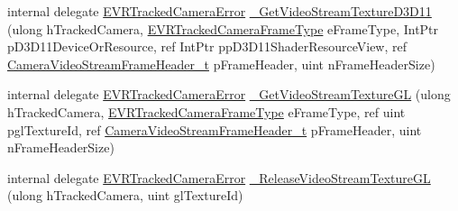 \begin{DoxyCompactItemize}
\item 
internal delegate \mbox{\hyperlink{namespace_valve_1_1_v_r_ad0e012e846f5d93848783c044614cfd3}{E\+V\+R\+Tracked\+Camera\+Error}} \mbox{\hyperlink{struct_valve_1_1_v_r_1_1_i_v_r_tracked_camera_a3b47cba3117a77b9f31e6e58ceb9936e}{\+\_\+\+Get\+Video\+Stream\+Texture\+D3\+D11}} (ulong h\+Tracked\+Camera, \mbox{\hyperlink{namespace_valve_1_1_v_r_a9962211bc3fe98c2683db188c12c9afd}{E\+V\+R\+Tracked\+Camera\+Frame\+Type}} e\+Frame\+Type, Int\+Ptr p\+D3\+D11\+Device\+Or\+Resource, ref Int\+Ptr pp\+D3\+D11\+Shader\+Resource\+View, ref \mbox{\hyperlink{struct_valve_1_1_v_r_1_1_camera_video_stream_frame_header__t}{Camera\+Video\+Stream\+Frame\+Header\+\_\+t}} p\+Frame\+Header, uint n\+Frame\+Header\+Size)
\item 
internal delegate \mbox{\hyperlink{namespace_valve_1_1_v_r_ad0e012e846f5d93848783c044614cfd3}{E\+V\+R\+Tracked\+Camera\+Error}} \mbox{\hyperlink{struct_valve_1_1_v_r_1_1_i_v_r_tracked_camera_afb798bb54c37360e64429e07763b6cff}{\+\_\+\+Get\+Video\+Stream\+Texture\+GL}} (ulong h\+Tracked\+Camera, \mbox{\hyperlink{namespace_valve_1_1_v_r_a9962211bc3fe98c2683db188c12c9afd}{E\+V\+R\+Tracked\+Camera\+Frame\+Type}} e\+Frame\+Type, ref uint pgl\+Texture\+Id, ref \mbox{\hyperlink{struct_valve_1_1_v_r_1_1_camera_video_stream_frame_header__t}{Camera\+Video\+Stream\+Frame\+Header\+\_\+t}} p\+Frame\+Header, uint n\+Frame\+Header\+Size)
\item 
internal delegate \mbox{\hyperlink{namespace_valve_1_1_v_r_ad0e012e846f5d93848783c044614cfd3}{E\+V\+R\+Tracked\+Camera\+Error}} \mbox{\hyperlink{struct_valve_1_1_v_r_1_1_i_v_r_tracked_camera_aabf5efcf29016561cc7b4108916f3632}{\+\_\+\+Release\+Video\+Stream\+Texture\+GL}} (ulong h\+Tracked\+Camera, uint gl\+Texture\+Id)
\end{DoxyCompactItemize}
